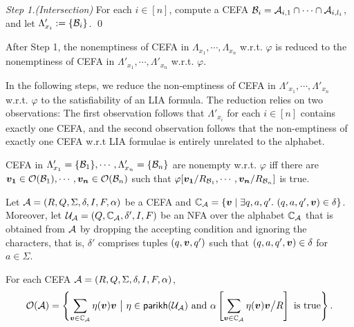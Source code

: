 \medskip
\noindent
\emph{Step 1.(Intersection)} For each $i \in [n]$, compute a CEFA $\mathcal{B}_{i} = \mathcal{A}_{i,1} \cap \cdots \cap \mathcal{A}_{i, l_i}$, and let $\Lambda'_{x_i} := \{\mathcal{B}_i\}$. \qed

After Step 1, the nonemptiness of CEFA in $\Lambda_{x_1}, \cdots, \Lambda_{x_n}$ w.r.t. $\varphi$ is reduced to the nonemptiness of CEFA in $\Lambda'_{x_1}, \cdots, \Lambda'_{x_n}$ w.r.t. $\varphi$. 

In the following steps, we reduce the non-emptiness of CEFA in $\Lambda'_{x_1}, \cdots, \Lambda'_{x_n}$ w.r.t. $\varphi$ to the satisfiability of an LIA formula. The reduction relies on two observations: The first observation follows that $\Lambda'_{x_i}$ for each $i \in [n]$ contains exactly one CEFA, and the second observation follows that the non-emptiness of exactly one CEFA w.r.t LIA formulae is entirely unrelated to the alphabet.

\begin{observation}\label{obs-cefa-output}
CEFA in $\Lambda'_{x_1} = \{\mathcal{B}_1\}, \cdots, \Lambda'_{x_n} = \{\mathcal{B}_n\}$ are nonempty w.r.t. $\varphi$ iff there are $\myvec{v_{1}} \in \cefaout(\cB_1), \cdots, \myvec{v_{n}} \in \cefaout(\cB_n)$ such that $\varphi[\myvec{v_{1}}/R_{\cB_{1}}, \cdots, \myvec{v_{n}}/R_{\cB_{n}}]$ is true.
\end{observation}

Let $\mathcal{A} = (R, Q, \Sigma, \delta, I, F, \alpha)$ be a CEFA and $\costset_\aut = \{\myvec{v} \mid \exists q, a, q'.\ (q, a, q', \myvec{v}) \in \delta\}$. 
Moreover, let $\mathcal{U}_{\mathcal{A}} = (Q, \mathbb{C}_{\mathcal{A}}, \delta', I, F)$ be an NFA over the alphabet $\mathbb{C}_{\mathcal{A}}$ that is obtained from $\mathcal{A}$ by dropping the accepting condition and ignoring the characters, that is, $\delta'$ comprises tuples $(q, \myvec{v}, q')$ such that $(q, a, q', \myvec{v}) \in \delta$ for $a \in \Sigma$.
%

\begin{observation}\label{obs-cefa-nfa}
For each CEFA $\mathcal{A} = (R, Q, \Sigma, \delta, I, F, \alpha)$, 
%
$$\cefaout(\aut) = \left\{\sum \limits_{\myvec{v} \in \costset_\aut} \eta(\myvec{v}) \myvec{v} \  \big{|}\ \eta \in \parikh(\cU_\aut) \mbox{ and }  \alpha\left[ \sum \limits_{\myvec{v} \in \costset_\aut} \eta(\myvec{v}) \myvec{v} \big{/} R \right] \mbox{ is true}\right\}.$$
%
\end{observation}


